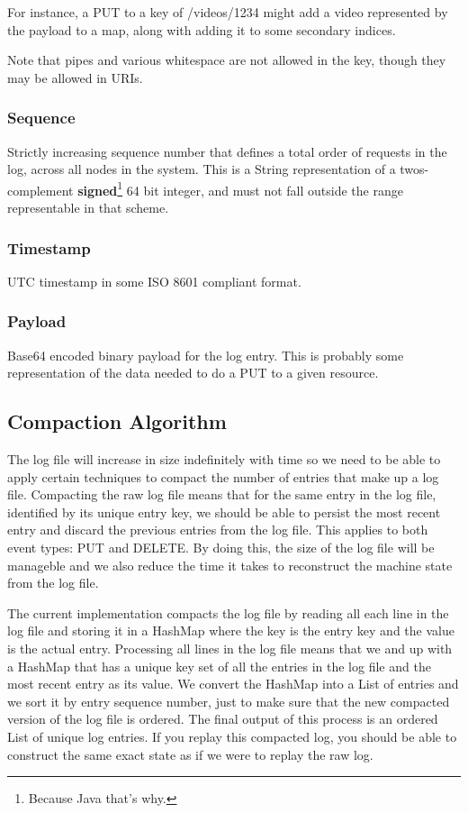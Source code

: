 \documentclass[11pt]{article}
\begin{document}
For instance, a PUT to a key of /videos/1234 might add a video represented by the payload to a map, along with adding it to some secondary indices.  

Note that pipes and various whitespace are not allowed in the key, though they may be allowed in URIs.

\subsubsection{Sequence}
Strictly increasing sequence number that defines a total order of requests in the log, across all nodes in the system.  This is a String representation of a twos-complement \textbf{signed}\footnote{Because Java that’s why.} 64 bit integer, and must not fall outside the range representable in that scheme.

\subsubsection{Timestamp}
UTC timestamp in some ISO 8601 compliant format.

\subsubsection{Payload}
Base64 encoded binary payload for the log entry.  This is probably some representation of the data needed to do a PUT to a given resource.


\subsection{Compaction Algorithm}

The log file will increase in size indefinitely with time so we  need to be able to apply certain techniques to compact the number of entries that make up a log file. Compacting the raw log file means that for the same entry in the log file, identified by its unique entry key, we should be able to persist the most recent entry and discard the previous entries from the log file. This applies to both event types: PUT and DELETE. By doing this, the size of the log file will be manageble and we also reduce the time it takes to reconstruct the machine state from the log file.

The current implementation compacts the log file by reading all each line in the log file and storing it in a HashMap where the key is the entry key and the value is the actual entry. Processing all lines in the log file means that we and up with a HashMap that has a unique key set of all the entries in the log file and the most recent entry as its value. We convert the HashMap into a List of entries and we sort it by entry sequence number, just to make sure that the new compacted version of the log file is ordered. The final output of this process is an ordered List of unique log entries. If you replay this compacted log, you should be able to construct the same exact state as if we were to replay the raw log.
\end{document}
